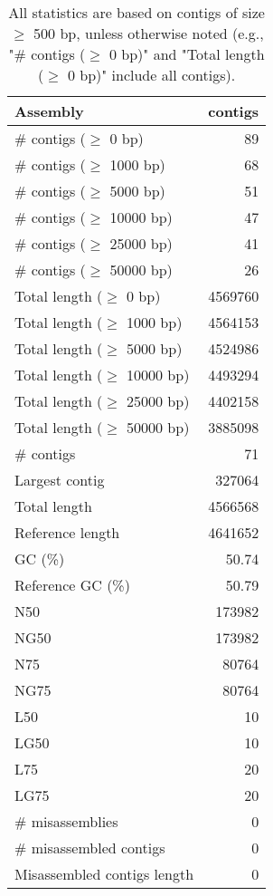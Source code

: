 \documentclass[12pt,a4paper]{article}
\begin{document}
\begin{table}[ht]
\begin{center}
\caption{All statistics are based on contigs of size $\geq$ 500 bp, unless otherwise noted (e.g., "\# contigs ($\geq$ 0 bp)" and "Total length ($\geq$ 0 bp)" include all contigs).}
\begin{tabular}{|l*{1}{|r}|}
\hline
Assembly & contigs \\ \hline
\# contigs ($\geq$ 0 bp) & 89 \\ \hline
\# contigs ($\geq$ 1000 bp) & 68 \\ \hline
\# contigs ($\geq$ 5000 bp) & 51 \\ \hline
\# contigs ($\geq$ 10000 bp) & 47 \\ \hline
\# contigs ($\geq$ 25000 bp) & 41 \\ \hline
\# contigs ($\geq$ 50000 bp) & 26 \\ \hline
Total length ($\geq$ 0 bp) & 4569760 \\ \hline
Total length ($\geq$ 1000 bp) & 4564153 \\ \hline
Total length ($\geq$ 5000 bp) & 4524986 \\ \hline
Total length ($\geq$ 10000 bp) & 4493294 \\ \hline
Total length ($\geq$ 25000 bp) & 4402158 \\ \hline
Total length ($\geq$ 50000 bp) & 3885098 \\ \hline
\# contigs & 71 \\ \hline
Largest contig & 327064 \\ \hline
Total length & 4566568 \\ \hline
Reference length & 4641652 \\ \hline
GC (\%) & 50.74 \\ \hline
Reference GC (\%) & 50.79 \\ \hline
N50 & 173982 \\ \hline
NG50 & 173982 \\ \hline
N75 & 80764 \\ \hline
NG75 & 80764 \\ \hline
L50 & 10 \\ \hline
LG50 & 10 \\ \hline
L75 & 20 \\ \hline
LG75 & 20 \\ \hline
\# misassemblies & 0 \\ \hline
\# misassembled contigs & 0 \\ \hline
Misassembled contigs length & 0 \\ \hline

\end{tabular}
\end{center}
\end{table}
\end{document}
